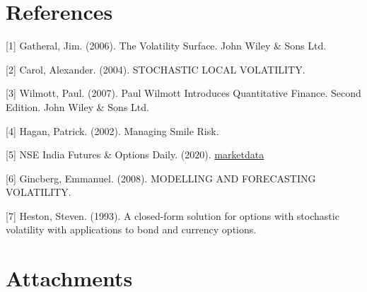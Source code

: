 \documentclass[a4paper,fleqn,12pt]{extarticle}
\begin{document}
	
	\newpage
	\section{References}
	[1] Gatheral, Jim. (2006). The Volatility Surface. John Wiley \& Sons Ltd.

	[2] Carol, Alexander. (2004). STOCHASTIC LOCAL VOLATILITY.

	[3] Wilmott, Paul. (2007). Paul Wilmott Introduces Quantitative Finance. Second Edition. John Wiley \& Sons Ltd.
	
	[4] Hagan, Patrick. (2002). Managing Smile Risk.

	[5] NSE India Futures \& Options Daily. (2020). \href{https://www.kaggle.com/datasets/tanay001/nseindia-futures-options-daily/data}{marketdata}

	[6] Gincberg, Emmanuel. (2008). MODELLING AND FORECASTING VOLATILITY.

	[7] Heston, Steven. (1993). A closed-form solution for options with stochastic volatility with applications to bond and currency options.


	\newpage
	\section{Attachments}


	
\end{document}
